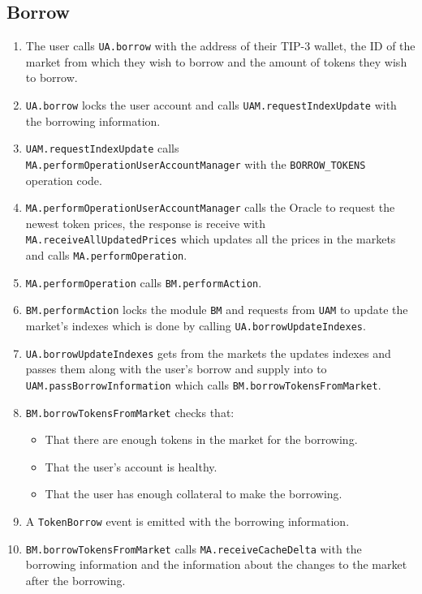 \subsection{Borrow}
\begin{enumerate}
  \item The user calls \verb|UA.borrow| with the address of their TIP-3 wallet, the ID of the market from which they wish to borrow and the amount of tokens they wish to borrow.
  \item \verb|UA.borrow| locks the user account and calls \verb|UAM.requestIndexUpdate| with the borrowing information.
  \item \verb|UAM.requestIndexUpdate| calls \\\verb|MA.performOperationUserAccountManager| with the \verb|BORROW_TOKENS| operation code.
  \item \verb|MA.performOperationUserAccountManager| calls the Oracle to request the newest token prices, the response is receive with \\\verb|MA.receiveAllUpdatedPrices| which updates all the prices in the markets and calls \verb|MA.performOperation|.
  \item \verb|MA.performOperation| calls \verb|BM.performAction|.
  \item \verb|BM.performAction| locks the module \verb|BM| and requests from \verb|UAM| to update the market's indexes which is done by calling \verb|UA.borrowUpdateIndexes|.
  \item \verb|UA.borrowUpdateIndexes| gets from the markets the updates indexes and passes them along with the user's borrow and supply into to \\\verb|UAM.passBorrowInformation| which calls \verb|BM.borrowTokensFromMarket|.
  \item \verb|BM.borrowTokensFromMarket| checks that:
  \begin{itemize}
    \item That there are enough tokens in the market for the borrowing.
    \item That the user's account is healthy.
    \item That the user has enough collateral to make the borrowing.
  \end{itemize}
  \item A \verb|TokenBorrow| event is emitted with the borrowing information.
  \item \verb|BM.borrowTokensFromMarket| calls \verb|MA.receiveCacheDelta| with the borrowing information and the information about the changes to the market after the borrowing.

\end{enumerate}
